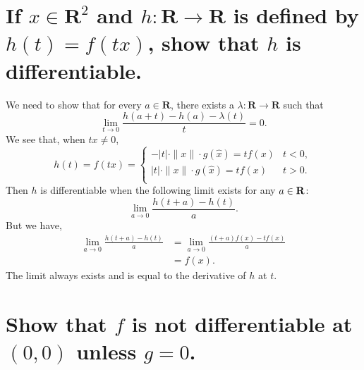 \begin{parts}
    \part{
        If $x\in \mathbf{R}^2$ and
        $h:\mathbf{R}\to\mathbf{R}
        $ is defined by $h(t)=f(tx)$, show that
        $h$ is differentiable.
    }

    \begin{solution}
        We need to show that for every $a\in
        \mathbf{R}$, there
        exists a $\lambda:\mathbf{R}\to\mathbf{R}$
        such that
        \begin{equation}
            \lim_{t\to 0}
            {\frac{h(a+t)-h(a)-\lambda(t)}{t}} = 0.
        \end{equation}
        We see that, when $tx\neq 0$,
        $$h(t)=f(tx)=
        \begin{cases}
            -\vert t\vert\cdot\|x\|\cdot 
            g\left(\hat{x}\right) = tf(x) & t<0,\\
            \vert t\vert\cdot\|x\|\cdot 
            g\left(\hat{x}\right) = tf(x) & t>0.\\
        \end{cases}$$
        Then $h$ is differentiable when the
        following
        limit exists for any $a\in \mathbf{R}$:
        $$\lim_{a \to 0 }{\frac{h(t+a)-h(t)}{a}}.$$
        But we have,
        \begin{align*}
            \lim_{a\to 0}{\frac{h(t+a)-h(t)}{a}}
            &=\lim_{a\to 0}{\frac{(t+a)f(x)-tf(x)}
            {a}}\\
            &= f(x).
        \end{align*}
        The limit always exists and is equal to the
        derivative of $h$ at $t$.
    \end{solution}

    \part{
        Show that $f$ is not differentiable at
        $(0,0)$
        unless $g=0$.
    }
    \begin{solution}
        
    \end{solution}
\end{parts}